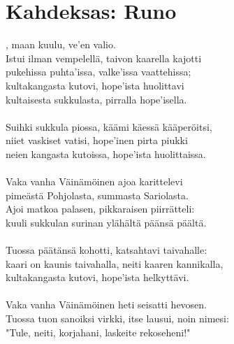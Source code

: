 
\chapter*{Kahdeksas: Runo}

, maan kuulu, ve'en valio.\\
Istui ilman vempelellä, taivon kaarella kajotti                 \\
pukehissa puhta'issa, valke'issa vaattehissa;                   \\
kultakangasta kutovi, hope'ista huolittavi                      \\
kultaisesta sukkulasta, pirralla hope'isella.                   \\
                                                                \\
Suihki sukkula piossa, käämi käessä kääperöitsi,                \\
niiet vaskiset vatisi, hope'inen pirta piukki                   \\
neien kangasta kutoissa, hope'ista huolittaissa.                \\
                                                                \\
Vaka vanha Väinämöinen ajoa karittelevi                         \\
pimeästä Pohjolasta, summasta Sariolasta.                       \\
Ajoi matkoa palasen, pikkaraisen piirrätteli:                   \\
kuuli sukkulan surinan ylähältä päänsä päältä.                  \\
                                                                \\
Tuossa päätänsä kohotti, katsahtavi taivahalle:                 \\
kaari on kaunis taivahalla, neiti kaaren kannikalla,            \\
kultakangasta kutovi, hope'ista helkyttävi.                     \\
                                                                \\
Vaka vanha Väinämöinen heti seisatti hevosen.                   \\
Tuossa tuon sanoiksi virkki, itse lausui, noin nimesi:          \\
"Tule, neiti, korjahani, laskeite rekoseheni!"                  \\
